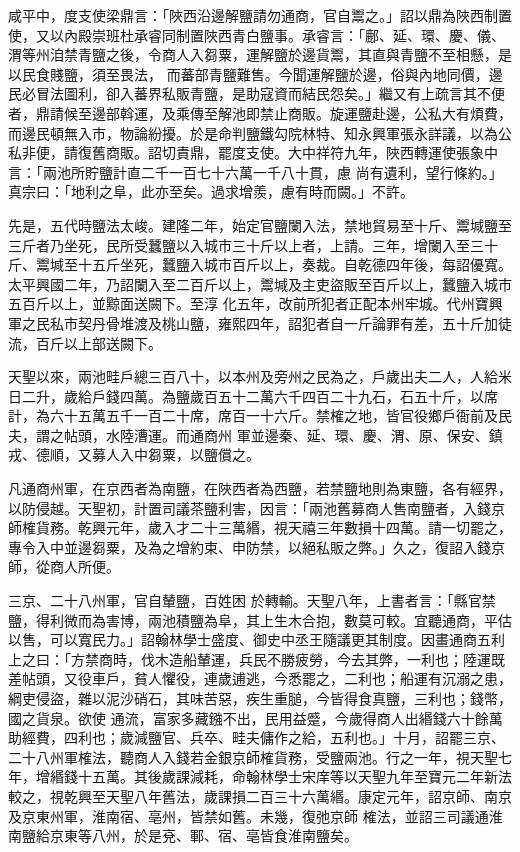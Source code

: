 \begin{pinyinscope}
 咸平中，度支使梁鼎言：「陜西沿邊解鹽請勿通商，官自鬻之。」詔以鼎為陜西制置使，又以內殿崇班杜承睿同制置陜西青白鹽事。承睿言：「鄜、延、環、慶、儀、渭等州洎禁青鹽之後，令商人入芻粟，運解鹽於邊貨鬻，其直與青鹽不至相懸，是以民食賤鹽，須至畏法，
 而蕃部青鹽難售。今聞運解鹽於邊，俗與內地同價，邊民必冒法圖利，卻入蕃界私販青鹽，是助寇資而結民怨矣。」繼又有上疏言其不便者，鼎請候至邊部斡運，及乘傳至解池即禁止商販。旋運鹽赴邊，公私大有煩費，而邊民頓無入市，物論紛擾。於是命判鹽鐵勾院林特、知永興軍張永詳議，以為公私非便，請復舊商販。詔切責鼎，罷度支使。大中祥符九年，陜西轉運使張象中言：「兩池所貯鹽計直二千一百七十六萬一千八十貫，慮
 尚有遺利，望行條約。」真宗曰：「地利之阜，此亦至矣。過求增羨，慮有時而闕。」不許。



 先是，五代時鹽法太峻。建隆二年，始定官鹽闌入法，禁地貿易至十斤、鬻堿鹽至三斤者乃坐死，民所受蠶鹽以入城市三十斤以上者，上請。三年，增闌入至三十斤、鬻堿至十五斤坐死，蠶鹽入城市百斤以上，奏裁。自乾德四年後，每詔優寬。太平興國二年，乃詔闌入至二百斤以上，鬻堿及主吏盜販至百斤以上，蠶鹽入城市五百斤以上，並黥面送闕下。至淳
 化五年，改前所犯者正配本州牢城。代州寶興軍之民私市契丹骨堆渡及桃山鹽，雍熙四年，詔犯者自一斤論罪有差，五十斤加徒流，百斤以上部送闕下。



 天聖以來，兩池畦戶總三百八十，以本州及旁州之民為之，戶歲出夫二人，人給米日二升，歲給戶錢四萬。為鹽歲百五十二萬六千四百二十九石，石五十斤，以席計，為六十五萬五千一百二十席，席百一十六斤。禁榷之地，皆官役鄉戶衙前及民夫，謂之帖頭，水陸漕運。而通商州
 軍並邊秦、延、環、慶、渭、原、保安、鎮戎、德順，又募人入中芻粟，以鹽償之。



 凡通商州軍，在京西者為南鹽，在陜西者為西鹽，若禁鹽地則為東鹽，各有經界，以防侵越。天聖初，計置司議茶鹽利害，因言：「兩池舊募商人售南鹽者，入錢京師榷貨務。乾興元年，歲入才二十三萬緡，視天禧三年數損十四萬。請一切罷之，專令入中並邊芻粟，及為之增約束、申防禁，以絕私販之弊。」久之，復詔入錢京師，從商人所便。



 三京、二十八州軍，官自輦鹽，百姓困
 於轉輸。天聖八年，上書者言：「縣官禁鹽，得利微而為害博，兩池積鹽為阜，其上生木合抱，數莫可較。宜聽通商，平估以售，可以寬民力。」詔翰林學士盛度、御史中丞王隨議更其制度。因畫通商五利上之曰：「方禁商時，伐木造船輦運，兵民不勝疲勞，今去其弊，一利也；陸運既差帖頭，又役車戶，貧人懼役，連歲逋逃，今悉罷之，二利也；船運有沉溺之患，綱吏侵盜，雜以泥沙硝石，其味苦惡，疾生重膇，今皆得食真鹽，三利也；錢幣，國之貨泉。欲使
 通流，富家多藏鏹不出，民用益蹙，今歲得商人出緡錢六十餘萬助經費，四利也；歲減鹽官、兵卒、畦夫傭作之給，五利也。」十月，詔罷三京、二十八州軍榷法，聽商人入錢若金銀京師榷貨務，受鹽兩池。行之一年，視天聖七年，增緡錢十五萬。其後歲課減耗，命翰林學士宋庠等以天聖九年至寶元二年新法較之，視乾興至天聖八年舊法，歲課損二百三十六萬緡。康定元年，詔京師、南京及京東州軍，淮南宿、亳州，皆禁如舊。未幾，復弛京師
 榷法，並詔三司議通淮南鹽給京東等八州，於是兗、鄆、宿、亳皆食淮南鹽矣。




\end{pinyinscope}

